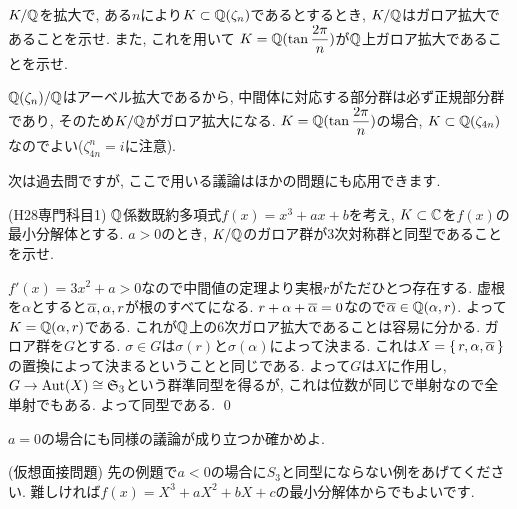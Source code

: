 \begin{egprob}
$K/\mathbb{Q}$を拡大で, ある$n$により$K\subset \mathbb{Q}(\zeta_n)$であるとするとき, $K/\mathbb{Q}$はガロア拡大であることを示せ. また, これを用いて $K=\mathbb{Q}(\tan{\dfrac{2\pi}{n}})$が$\mathbb{Q}$上ガロア拡大であることを示せ.
\end{egprob}
\begin{egans}
$\mathbb{Q}(\zeta_n)/\mathbb{Q}$はアーベル拡大であるから, 中間体に対応する部分群は必ず正規部分群であり, そのため$K/\mathbb{Q}$がガロア拡大になる. $K=\mathbb{Q}(\tan{\dfrac{2\pi}{n}})$の場合, $K\subset \mathbb{Q}(\zeta_{4n})$なのでよい($\zeta_{4n}^{n} = i$に注意).
\end{egans}


次は過去問ですが, ここで用いる議論はほかの問題にも応用できます.

\begin{egprob} (H28専門科目1) \label{prob:H28senmon-1}
$\mathbb{Q}$係数既約多項式$f(x) = x^3 + ax+b$を考え, $K\subset \mathbb{C}$を$f(x)$の最小分解体とする. $a>0$のとき, $K/\mathbb{Q}$のガロア群が3次対称群と同型であることを示せ.
\end{egprob}
\begin{egans}
$f'(x) = 3x^2+a>0$なので中間値の定理より実根$r$がただひとつ存在する. 虚根を$\alpha$とすると$\overline{\alpha}, \alpha , r$が根のすべてになる. $r+\alpha + \overline{\alpha} = 0$なので$\overline{\alpha} \in \mathbb{Q}(\alpha,r)$. よって$K=\mathbb{Q}(\alpha,r)$である. これが$\mathbb{Q}$上の6次ガロア拡大であることは容易に分かる. ガロア群を$G$とする. $\sigma\in G$は$\sigma(r)$と$\sigma(\alpha)$によって決まる. これは$X=\set{r,\alpha,\overline{\alpha}}$の置換によって決まるということと同じである. よって$G$は$X$に作用し, $G\to \mathrm{Aut}(X)\cong \mathfrak{S}_{3}$という群準同型を得るが, これは位数が同じで単射なので全単射でもある. よって同型である. \qed
\end{egans}

\begin{prac}
$a=0$の場合にも同様の議論が成り立つか確かめよ.
\end{prac}

\begin{egprob} (仮想面接問題)
先の例題で$a<0$の場合に$S_3$と同型にならない例をあげてください. 難しければ$f(x)=X^3+aX^2+bX+c$の最小分解体からでもよいです.
\end{egprob}

